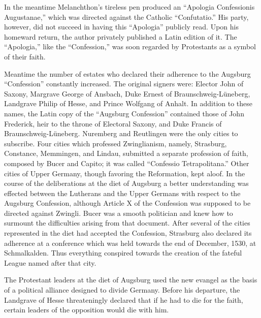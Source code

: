 In the meantime Melanchthon’s tireless pen produced an “Apologia
Confessionis Augustanae,” which was directed against the Catholic
“Confutatio.” His party, however, did not succeed in having this
“Apologia” publicly read. Upon his homeward return, the author
privately published a Latin edition of it. The “Apologia,” like the
“Confession,” was soon regarded by Protestants as a symbol of their
faith.

Meantime the number of estates who declared their adherence to
the Augsburg “Confession” constantly increased. The original signers
were: Elector John of Saxony, Margrave George of Ansbach, Duke
Ernest of Braunschweig-Lüneberg, Landgrave Philip of Hesse, and
Prince Wolfgang of Anhalt. In addition to these names, the Latin
copy of the “Augsburg Confession” contained those of John Frederick, heir
to the throne of Electoral Saxony, and Duke Francis of
Braunschweig-Lüneberg. Nuremberg and Reutlingen were the only
cities to subscribe. Four cities which professed Zwinglianism, namely,
Strasburg, Constance, Memmingen, and Lindau, submitted a separate profession
of faith, composed by Bucer and Capito; it was
called “Confessio Tetrapolitana.” Other cities of Upper Germany,
though favoring the Reformation, kept aloof. In the course of the
deliberations at the diet of Augsburg a better understanding was
effected between the Lutherans and the Upper Germans with respect
to the Augsburg Confession, although Article X of the Confession
was supposed to be directed against Zwingli. Bucer was a smooth
politician and knew how to surmount the difficulties arising from that
document. After several of the cities represented in the diet had accepted
the Confession, Strasburg also declared its adherence at a conference
which was held towards the end of December, 1530, at
Schmalkalden. Thus everything conspired towards the creation of the
fateful League named after that city.

The Protestant leaders at the diet of Augsburg used the new
evangel as the basis of a political alliance designed to divide Germany.
Before his departure, the Landgrave of Hesse threateningly declared
that if he had to die for the faith, certain leaders of the opposition
would die with him.

